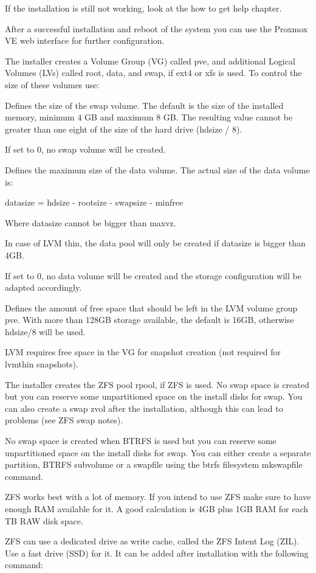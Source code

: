 If the installation is still not working, look at the how to get help chapter.

After a successful installation and reboot of the system you can use the Proxmox VE web interface for further configuration.

The installer creates a Volume Group (VG) called pve, and additional Logical Volumes (LVs) called root, data, and swap, if ext4 or xfs is used. To control the size of these volumes use:

Defines the size of the swap volume. The default is the size of the installed memory, minimum 4 GB and maximum 8 GB. The resulting value cannot be greater than one eight of the size of the hard drive (hdsize / 8).

If set to 0, no swap volume will be created.

Defines the maximum size of the data volume. The actual size of the data volume is:

datasize = hdsize - rootsize - swapsize - minfree

Where datasize cannot be bigger than maxvz.

In case of LVM thin, the data pool will only be created if datasize is bigger than 4GB.

If set to 0, no data volume will be created and the storage configuration will be adapted accordingly.

Defines the amount of free space that should be left in the LVM volume group pve. With more than 128GB storage available, the default is 16GB, otherwise hdsize/8 will be used.

LVM requires free space in the VG for snapshot creation (not required for lvmthin snapshots).

The installer creates the ZFS pool rpool, if ZFS is used. No swap space is created but you can reserve some unpartitioned space on the install disks for swap. You can also create a swap zvol after the installation, although this can lead to problems (see ZFS swap notes).

No swap space is created when BTRFS is used but you can reserve some unpartitioned space on the install disks for swap. You can either create a separate partition, BTRFS subvolume or a swapfile using the btrfs filesystem mkswapfile command.

ZFS works best with a lot of memory. If you intend to use ZFS make sure to have enough RAM available for it. A good calculation is 4GB plus 1GB RAM for each TB RAW disk space.

ZFS can use a dedicated drive as write cache, called the ZFS Intent Log (ZIL). Use a fast drive (SSD) for it. It can be added after installation with the following command:

